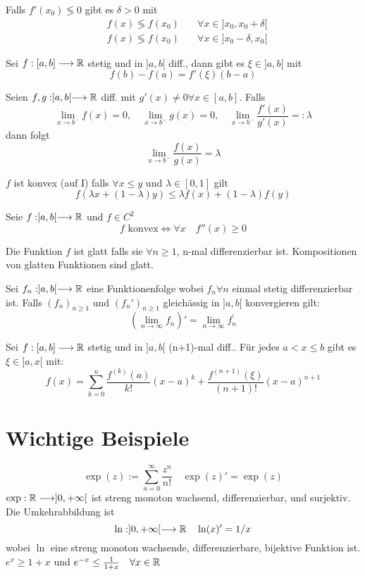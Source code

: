 \Satz Falls $f'(x_0) \lessgtr 0$ gibt es $\delta > 0$ mit
\begin{align*}
	&f(x) \lessgtr f(x_0) \quad &\forall x \in ]x_0, x_0+\delta[ \\
	&f(x) \lessgtr f(x_0) \quad &\forall x \in ]x_0-\delta, x_0[ 
\end{align*}

 Sei $f:[a,b] \longrightarrow \mathbb{R}$ stetig und in $]a,b[$ diff., dann gibt es $\xi \in ]a,b[$ mit
$$f(b)-f(a) = f'(\xi)(b-a)$$

\Satz[L'Hospital] Seien $f,g: ]a,b[ \longrightarrow \mathbb{R}$ diff. mit $g'(x) \neq 0 \forall x \in [a,b]$. Falls
$$\lim _{x \rightarrow b^{-}} f(x)=0, \quad \lim _{x \rightarrow b^{-}} g(x)=0, \quad \lim _{x \rightarrow b^{-}} \frac{f'(x)}{g'(x)}=:\lambda$$
dann folgt
$$\lim _{x \rightarrow b^{-}} \frac{f(x)}{g(x)}=\lambda$$


\Def[Konvex] $f$ ist konvex (auf I) falls $\forall x \leq y$ und $\lambda \in [0,1]$ gilt
$$f(\lambda x+(1-\lambda) y) \leqslant \lambda f(x)+(1-\lambda) f(y)$$

\Lemma[Konvex] Seie $f: ]a,b[ \longrightarrow \mathbb{R}$ und $f \in C^2$ 
$$ f \text{ konvex} \iff \forall x \quad f''(x) \geq 0$$

\Def[Glatt] Die Funktion $f$ ist glatt falls sie $\forall n \geq 1$, n-mal differenzierbar ist. Kompositionen von glatten Funktionen sind glatt.

\Satz[Funktionenfolgen] Sei $f_n:]a,b[ \longrightarrow \mathbb{R}$ eine Funktionenfolge wobei $f_n \forall n$ einmal stetig differenzierbar ist. Falls $(f_n)_{n\geqslant1}$ und $(f_n')_{n\geqslant1}$ gleichässig in $]a,b[$ konvergieren gilt:
$$(\lim _{n \rightarrow \infty} f_{n})'=\lim _{n \rightarrow \infty} f_{n}^{\prime}$$

 Sei $f:[a,b] \longrightarrow \mathbb{R}$ stetig und in $]a,b[$ (n+1)-mal diff.. Für jedes $a<x\leqslant b$ gibt es $\xi \in ]a,x[$ mit:
$$f(x)=\sum_{k=0}^{n} \frac{f^{(k)}(a)}{k !}(x-a)^{k}+\frac{f^{(n+1)}(\xi)}{(n+1) !}(x-a)^{n+1}$$


\section{Wichtige Beispiele}
\Bsp[Exponentialfunktion]
$$\exp (z):=\sum_{n=0}^{\infty} \frac{z^{n}}{n !} \quad \exp (z)' = \exp(z)$$
$\exp : \mathbb{R} \longrightarrow] 0,+\infty[$ ist streng monoton wachsend, differenzierbar, und surjektiv.
Die Umkehrabbildung ist 
$$\ln :] 0,+\infty[\longrightarrow \mathbb{R} \quad \ln (x)' = 1/x$$
wobei $\ln$ eine streng monoton wachsende, differenzierbare, bijektive Funktion ist. \\
\Lemma $e^x \geq 1+x$ und $e^{-x} \leq \frac{1}{1+x} \quad \forall x \in \mathbb{R}$

